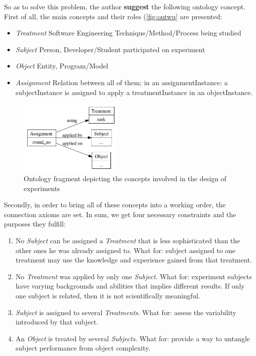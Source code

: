 	So as to solve this problem, the author \textbf{suggest} the following ontology concept. First of all, the main concepts and their roles (\autoref{fig:ontwu} are presented: 
	\begin{itemize}
		\item{\textit{Treatment}} Software Engineering Technique/Method/Process being studied
		\item{\textit{Subject}} Person, Developer/Student participated on experiment
		\item{\textit{Object}} Entity, Program/Model
		\item{\textit{Assignment}} Relation between all of them; in an assignmentInstance: a subjectInstance is assigned to apply a treatmentInstance in an objectInstance. 
	\end{itemize}
	\begin{figure}
		\centering
		\includegraphics[width=5cm]{images/OntWu.PNG}
		\caption{Ontology fragment depicting the concepts involved in the design of experiments\cite[p. 13]{SiyWu12}}
		\label{fig:ontwu}
	\end{figure} 
	Secondly, in order to bring all of these concepts into a working order, the connection axioms are set. In sum, we get four necessary constraints and the purposes they fulfill:
	\begin{enumerate}
		\item No \textit{Subject} can be assigned a \textit{Treatment} that is less sophisticated than the other ones he was already assigned to. What for: subject assigned to one treatment may use the knowledge and experience
		gained from that treatment.
		\item No \textit{Treatment} was applied by only one \textit{Subject}. What for: experiment subjects have varying backgrounds and abilities that implies different results. If only one subject is related, then it is not scientifically meaningful.
		\item \textit{Subject} is assigned to several \textit{Treatments}. What for: assess the variability introduced by that subject.
		\item An \textit{Object} is treated by several \textit{Subjects}. What for: provide a way to untangle subject performance from object complexity.
	\end{enumerate}
	

